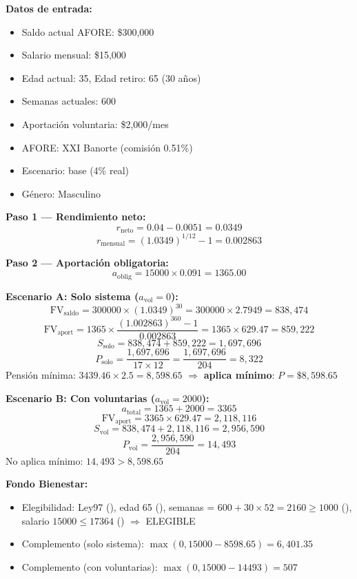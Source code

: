 \documentclass[11pt,a4paper]{report}
\begin{document}
\begin{tcolorbox}[colback=blue!5!white, colframe=blue!75!black, title=\textbf{Definici\'on Formal: Traza Num\'erica Completa}, breakable]
\textbf{Datos de entrada:}
\begin{itemize}
  \item Saldo actual AFORE: \$300,000
  \item Salario mensual: \$15,000
  \item Edad actual: 35, Edad retiro: 65 (30 a\~nos)
  \item Semanas actuales: 600
  \item Aportaci\'on voluntaria: \$2,000/mes
  \item AFORE: XXI Banorte (comisi\'on 0.51\%)
  \item Escenario: base (4\% real)
  \item G\'enero: Masculino
\end{itemize}

\textbf{Paso 1 --- Rendimiento neto:}
\[
  r_{\text{neto}} = 0.04 - 0.0051 = 0.0349
\]
\[
  r_{\text{mensual}} = (1.0349)^{1/12} - 1 = 0.002863
\]

\textbf{Paso 2 --- Aportaci\'on obligatoria:}
\[
  a_{\text{oblig}} = 15000 \times 0.091 = 1365.00
\]

\textbf{Escenario A: Solo sistema ($a_{\text{vol}} = 0$):}
\[
  \text{FV}_{\text{saldo}} = 300000 \times (1.0349)^{30} = 300000 \times 2.7949 = 838,474
\]
\[
  \text{FV}_{\text{aport}} = 1365 \times \frac{(1.002863)^{360} - 1}{0.002863} = 1365 \times 629.47 = 859,222
\]
\[
  S_{\text{solo}} = 838,474 + 859,222 = 1,697,696
\]
\[
  P_{\text{solo}} = \frac{1,697,696}{17 \times 12} = \frac{1,697,696}{204} = 8,322
\]
Pensi\'on m\'inima: $3439.46 \times 2.5 = 8,598.65$ $\Rightarrow$ \textbf{aplica m\'inimo}: $P = \$8,598.65$

\textbf{Escenario B: Con voluntarias ($a_{\text{vol}} = 2000$):}
\[
  a_{\text{total}} = 1365 + 2000 = 3365
\]
\[
  \text{FV}_{\text{aport}} = 3365 \times 629.47 = 2,118,116
\]
\[
  S_{\text{vol}} = 838,474 + 2,118,116 = 2,956,590
\]
\[
  P_{\text{vol}} = \frac{2,956,590}{204} = 14,493
\]
No aplica m\'inimo: $14,493 > 8,598.65$

\textbf{Fondo Bienestar:}
\begin{itemize}
  \item Elegibilidad: Ley97 (\checkmark), edad 65 (\checkmark), semanas = $600 + 30 \times 52 = 2160 \geq 1000$ (\checkmark), salario $15000 \leq 17364$ (\checkmark) $\Rightarrow$ ELEGIBLE
  \item Complemento (solo sistema): $\max(0, 15000 - 8598.65) = 6,401.35$
  \item Complemento (con voluntarias): $\max(0, 15000 - 14493) = 507$
\end{itemize}
\end{tcolorbox}
\end{document}
